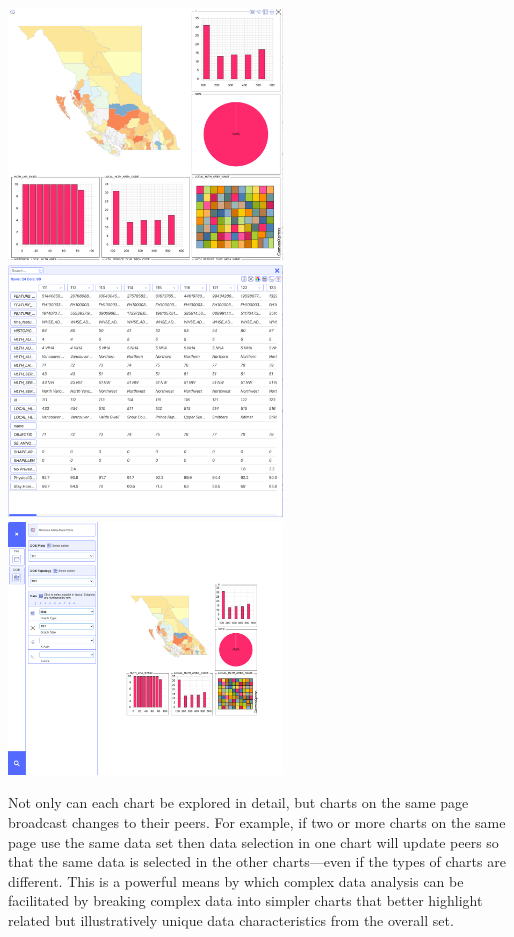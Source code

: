\documentclass[
  letterpaper,
  DIV=11,
  numbers=noendperiod]{scrartcl}
\begin{document}
\includegraphics[width=2.86458in,height=\textheight]{dashboard_chart.png}
\includegraphics[width=2.86458in,height=\textheight]{dashboard_data.png}
\includegraphics[width=2.86458in,height=\textheight]{dashboard_config.png}

Not only can each chart be explored in detail, but charts on the same
page broadcast changes to their peers. For example, if two or more
charts on the same page use the same data set then data selection in one
chart will update peers so that the same data is selected in the other
charts---even if the types of charts are different. This is a powerful
means by which complex data analysis can be facilitated by breaking
complex data into simpler charts that better highlight related but
illustratively unique data characteristics from the overall set.
\end{document}
